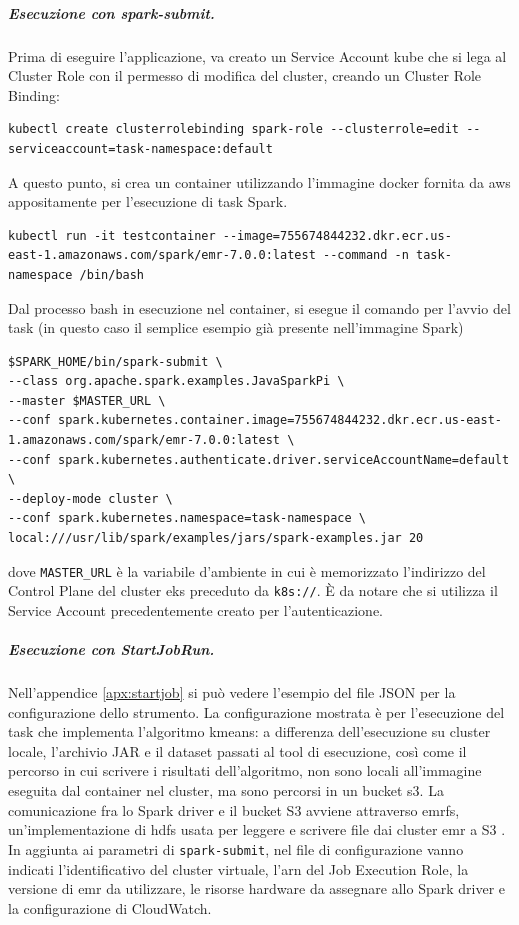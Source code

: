 \documentclass[12pt,a4paper,fleqn,titlepage]{report}
\begin{document}
            \subparagraph{Esecuzione con spark-submit.}
            Prima di eseguire l'applicazione, va creato un Service Account \gls{kube} che si lega al Cluster Role con il permesso di modifica del \gls{cluster}, creando un Cluster Role Binding:
            \begin{lstlisting}[numbers=none]
kubectl create clusterrolebinding spark-role --clusterrole=edit --serviceaccount=task-namespace:default
            \end{lstlisting}
            A questo punto, si crea un \gls{container} utilizzando l'immagine \gls{docker} fornita da \gls{aws} appositamente per l'esecuzione di task Spark.
            \begin{lstlisting}[numbers=none]
kubectl run -it testcontainer --image=755674844232.dkr.ecr.us-
east-1.amazonaws.com/spark/emr-7.0.0:latest --command -n task-namespace /bin/bash
            \end{lstlisting}
            Dal processo bash in esecuzione nel \gls{container}, si esegue il comando per l'avvio del task (in questo caso il semplice esempio già presente nell'immagine Spark)
            \begin{lstlisting}[numbers=none]
$SPARK_HOME/bin/spark-submit \
--class org.apache.spark.examples.JavaSparkPi \
--master $MASTER_URL \
--conf spark.kubernetes.container.image=755674844232.dkr.ecr.us-east-1.amazonaws.com/spark/emr-7.0.0:latest \
--conf spark.kubernetes.authenticate.driver.serviceAccountName=default \
--deploy-mode cluster \
--conf spark.kubernetes.namespace=task-namespace \
local:///usr/lib/spark/examples/jars/spark-examples.jar 20
            \end{lstlisting}
            dove \lstinline{MASTER_URL} è la variabile d'ambiente in cui è memorizzato l'indirizzo del Control Plane del \gls{cluster} \gls{eks} preceduto da \lstinline{k8s://}. È da notare che si utilizza il Service Account precedentemente creato per l'autenticazione.

            \subparagraph{Esecuzione con StartJobRun.}
            Nell'appendice \ref{apx:startjob} si può vedere l'esempio del file JSON per la configurazione dello strumento. La configurazione mostrata è per l'esecuzione del task che implementa l'algoritmo kmeans: a differenza dell'esecuzione su cluster locale, l'archivio JAR e il dataset passati al tool di esecuzione, così come il percorso in cui scrivere i risultati dell'algoritmo, non sono locali all'immagine eseguita dal \gls{container} nel \gls{cluster}, ma sono percorsi in un bucket \gls{s3}. La comunicazione fra lo Spark driver e il bucket S3 avviene attraverso \gls{emrfs}, un'implementazione di \gls{hdfs} usata per leggere e scrivere file dai cluster \gls{emr} a S3 \cite{emrfs:2024}. In aggiunta ai parametri di \lstinline{spark-submit}, nel file di configurazione vanno indicati l'identificativo del \gls{cluster} virtuale, l'\gls{arn} del Job Execution Role, la versione di \gls{emr} da utilizzare, le risorse hardware da assegnare allo Spark driver e la configurazione di CloudWatch.
\end{document}
